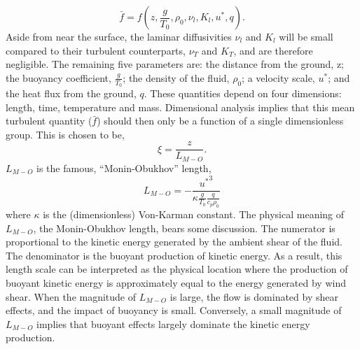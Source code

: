 \begin{equation}
\bar f = f(z,\frac{g}{T_0},\rho_0,\nu_l,K_l,u^*,q).
\end{equation}
Aside from near the surface, the laminar diffusivities $\nu_l$ and $K_l$ will be 
small compared to their turbulent counterparts, $\nu_T$ and $K_T$, and 
are therefore negligible. 
The remaining five parameters are: the distance from the ground, z; the
buoyancy coefficient, $\frac{g}{T_0}$; the density of the fluid,
$\rho_0$; a velocity scale, $u^*$; and the heat flux from the ground,
$q$. 
%
% 
These quantities depend on four dimensions: length, time, temperature
and mass. Dimensional analysis implies that this mean turbulent quantity
($\bar f$) should then only be a function of a single dimensionless
group\cite{munson2012fundamentals}. This is chosen to be,
\begin{equation}
 \xi = \frac{z}{L_{M-O}}.
\end{equation}
$L_{M-O}$ is the famous, ``Monin-Obukhov'' length,
\begin{equation}
 L_{M-O} = -\frac{{u^*}^3}{\kappa \frac{g}{T_0} \frac{q}{c_p \rho_0}}
\end{equation}
where $\kappa$ is the (dimensionless) Von-Karman constant. 
The physical meaning of $L_{M-O}$, the Monin-Obukhov length, bears some
discussion. The numerator is proportional to the kinetic energy
generated by the ambient  shear of the fluid. The denominator is the
buoyant production of kinetic energy.  As a result, this length scale
can be interpreted as the physical location where the production of
buoyant kinetic energy is approximately equal to the energy generated
by wind shear. When the magnitude of $L_{M-O}$ is large, the flow is
dominated by shear effects, and the impact of buoyancy is
small. Conversely, a small  magnitude of $L_{M-O}$ implies that buoyant
effects largely dominate the kinetic energy production. 

